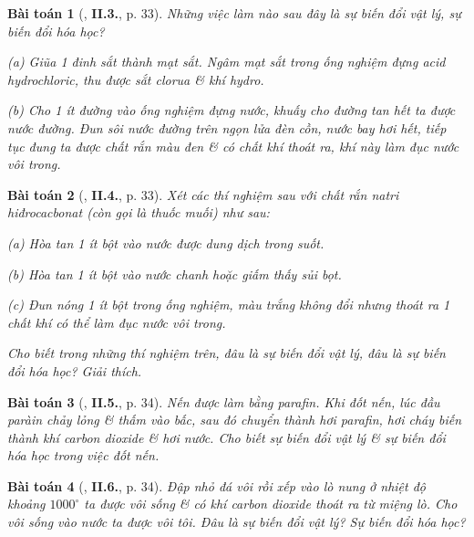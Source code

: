 \documentclass{article}
\numberwithin{equation}{section}
\newtheorem{baitoan}{Bài toán}
\begin{document}
\begin{baitoan}[\cite{Truong2021}, \textbf{II.3.}, p. 33]
	Những việc làm nào sau đây là sự biến đổi vật lý, sự biến đổi hóa học?
	\begin{enumerate*}
		\item[(a)] Giũa 1 đinh sắt thành mạt sắt. Ngâm mạt sắt trong ống nghiệm đựng acid hydrochloric, thu được sắt clorua \& khí hydro.
		\item[(b)] Cho 1 ít đường vào ống nghiệm đựng nước, khuấy cho đường tan hết ta được nước đường. Đun sôi nước đường trên ngọn lửa đèn cồn, nước bay hơi hết, tiếp tục đung ta được chất rắn màu đen \& có chất khí thoát ra, khí này làm đục nước vôi trong.
	\end{enumerate*}
\end{baitoan}

\begin{baitoan}[\cite{Truong2021}, \textbf{II.4.}, p. 33]
	Xét các thí nghiệm sau với chất rắn natri hiđrocacbonat \emph{} (còn gọi là \emph{thuốc muối}) như sau:
	\begin{enumerate*}
		\item[(a)] Hòa tan 1 ít bột \emph{} vào nước được dung dịch trong suốt.
		\item[(b)] Hòa tan 1 ít bột \emph{} vào nước chanh hoặc giấm thấy sủi bọt.
		\item[(c)] Đun nóng 1 ít bột \emph{} trong ống nghiệm, màu trắng không đổi nhưng thoát ra 1 chất khí có thể làm đục nước vôi trong.
	\end{enumerate*}
	Cho biết trong những thí nghiệm trên, đâu là sự biến đổi vật lý, đâu là sự biến đổi hóa học? Giải thích.
\end{baitoan}

\begin{baitoan}[\cite{Truong2021}, \textbf{II.5.}, p. 34]
	Nến được làm bằng parafin. Khi đốt nến, lúc đầu paràin chảy lỏng \& thấm vào bấc, sau đó chuyển thành hơi parafin, hơi cháy biến thành khí carbon dioxide \& hơi nước. Cho biết sự biến đổi vật lý \& sự biến đổi hóa học trong việc đốt nến.
\end{baitoan}

\begin{baitoan}[\cite{Truong2021}, \textbf{II.6.}, p. 34]
	Đập nhỏ đá vôi rồi xếp vào lò nung ở nhiệt độ khoảng $1000^\circ$ ta được vôi sống \& có khí carbon dioxide thoát ra từ miệng lò. Cho vôi sống vào nước ta được vôi tôi. Đâu là sự biến đổi vật lý? Sự biến đổi hóa học?
\end{baitoan}
\end{document}
